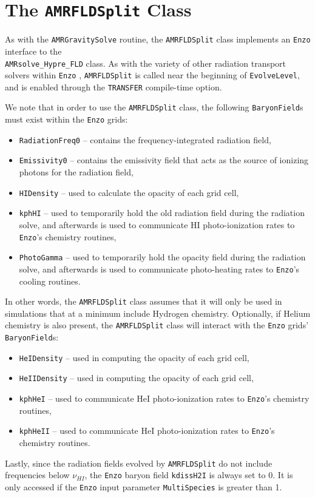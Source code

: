 \documentclass[letterpaper,10pt]{article}
\renewcommand{\(}{\left(}
\renewcommand{\)}{\right)}
\newcommand{\enzo}{{\tt Enzo} }
\begin{document}
\section{The {\tt AMRFLDSplit} Class}
\label{sec:AMRFLDSplit}

As with the {\tt AMRGravitySolve} routine, the {\tt AMRFLDSplit}
class implements an \enzo interface to the \\
{\tt AMRsolve\_Hypre\_FLD} class.  As with the variety of other
radiation transport solvers within \enzo, {\tt AMRFLDSplit} is called
near the beginning of {\tt EvolveLevel}, and is enabled through the
{\tt TRANSFER} compile-time option.

We note that in order to use the {\tt AMRFLDSplit} class, the
following {\tt BaryonField}s must exist within the \enzo grids:
\begin{itemize}
\item {\tt RadiationFreq0} -- contains the
  frequency-integrated radiation field,
\item {\tt Emissivity0} -- contains the emissivity field that
  acts as the source of ionizing photons for the radiation field,
\item {\tt HIDensity} -- used to calculate the opacity of
  each grid cell,
\item {\tt kphHI} -- used to temporarily hold the old radiation field
  during the radiation solve, and afterwards is used to communicate HI
  photo-ionization rates to {\tt Enzo}'s chemistry routines,
\item {\tt PhotoGamma} -- used to temporarily hold the opacity field
  during the radiation solve, and afterwards is used to communicate
  photo-heating rates to {\tt Enzo}'s cooling routines.
\end{itemize}
In other words, the {\tt AMRFLDSplit} class assumes that it will only
be used in simulations that at a minimum include Hydrogen chemistry.
Optionally, if Helium chemistry is also present, the {\tt AMRFLDSplit}
class will interact with the \enzo grids' {\tt BaryonField}s:
\begin{itemize}
\item {\tt HeIDensity} -- used in computing the opacity of each grid cell,
\item {\tt HeIIDensity} -- used in computing the opacity of each grid cell,
\item {\tt kphHeI} -- used to communicate HeI photo-ionization rates to
  {\tt Enzo}'s chemistry routines,
\item {\tt kphHeII} -- used to communicate HeI photo-ionization rates to
  {\tt Enzo}'s chemistry routines.
\end{itemize}
Lastly, since the radiation fields evolved by {\tt AMRFLDSplit} do not
include frequencies below $\nu_{HI}$, the \enzo baryon field 
{\tt kdissH2I} is always set to 0.  It is only accessed if the \enzo
input parameter {\tt MultiSpecies} is greater than 1.
\end{document}
